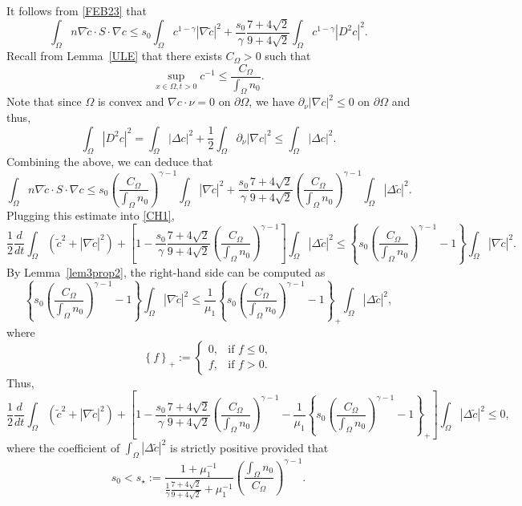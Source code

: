 \documentclass{amsart}
\numberwithin{equation}{section}
\newcommand{\bke}[1]{\left( #1 \right)}
\newcommand{\bkt}[1]{\left[ #1 \right]}
\newcommand{\bket}[1]{\left\{ #1 \right\}}
\newenvironment{pfthm3}{{\par\noindent\bf
           Proof of Theorem~\ref{THM3}. }}{\hfill\fbox{}\par\vspace{.2cm}}
\begin{document}
\begin{pfthm3}
\[\begin{aligned}
\end{aligned}
\]
It follows from \eqref{FEB23} that\[
\int_{\Omega} n\nabla \tilde{c}\cdot S \cdot \nabla c \le s_0 \int_{\Omega} c^{1-\gamma} |\nabla \tilde{c}|^2 + \frac{s_{0}}{\gamma} \frac{7+4\sqrt{2}}{9+4\sqrt{2}} \int_{\Omega} c^{1-\gamma} |D^2 c|^2.
\]
Recall from Lemma~\ref{ULE} that there exists $C_{\Omega}>0$ such that
\[
\sup_{x\in\Omega,t>0} c^{-1}\le \frac{C_{\Omega}}{\int_{\Omega}n_{0}}.
\]
Note that 
since $\Omega$ is convex and $\nabla c\cdot\nu=0$ on $\partial\Omega$, we have $\partial_\nu |\nabla c|^2 \le 0$ on $\partial\Omega$ and thus, 
\[
\int_{\Omega} |D^2 c|^2=\int_{\Omega} |\Delta c|^2+\frac{1}{2}\int_{\Omega}\partial_\nu |\nabla c|^2 \le \int_{\Omega} |\Delta c|^2.
\]  
Combining the above, we can deduce that
\[
\int_{\Omega} n\nabla \tilde{c}\cdot S \cdot \nabla c \le s_0 \bke{\frac{C_{\Omega}}{\int_{\Omega}n_{0}}}^{\gamma-1} \int_{\Omega} |\nabla \tilde{c}|^2 + \frac{s_{0}}{\gamma}\frac{7+4\sqrt{2}}{  9+4\sqrt{2} }\bke{\frac{C_{\Omega}}{\int_{\Omega}n_{0}}}^{\gamma-1} \int_{\Omega} |\Delta \tilde{c}|^2.
\]
Plugging this estimate into \eqref{CH1},  
\[
\frac{1}{2}\frac{d}{dt}\int_{\Omega}( \tilde{c}^{2}+|\nabla \tilde{c}|^{2})  + \bkt{1 - \frac{s_0}{\gamma}\frac{7+4\sqrt{2}}{  9+4\sqrt{2} }\bke{\frac{C_{\Omega}}{\int_{\Omega}n_{0}}}^{\gamma-1}}\int_{\Omega}|\Delta \tilde{c}|^{2} \le \bket{  s_0 \bke{\frac{C_{\Omega}}{\int_{\Omega}n_{0}}}^{\gamma-1}-1}\int_{\Omega }|\nabla \tilde{c}|^{2}.
\]
By Lemma~\ref{lem3prop2}, the right-hand side  can be computed as
\[
\bket{  s_0 \bke{\frac{C_{\Omega}}{\int_{\Omega}n_{0}}}^{\gamma-1}-1}\int_{\Omega }|\nabla \tilde{c}|^{2}\le \frac{1}{\mu_{1}}\bket{  s_0 \bke{\frac{C_{\Omega}}{\int_{\Omega}n_{0}}}^{\gamma-1}-1}_{+}\int_{\Omega }|\Delta \tilde{c}|^{2},
\]
where 
\[
\bket{f}_{+}:=\begin{cases}
0, & \text{if } f\le 0,\\[1mm]
f, & \text{if } f>0.
\end{cases}
\]
Thus,
\[
\frac{1}{2}\frac{d}{dt}\int_{\Omega}( \tilde{c}^{2}+|\nabla \tilde{c}|^{2})  +  \bkt{1 - \frac{s_0}{\gamma}\frac{7+4\sqrt{2}}{  9+4\sqrt{2} }\bke{\frac{C_{\Omega}}{\int_{\Omega}n_{0}}}^{\gamma-1} -\frac{1}{\mu_{1}}\bket{  s_0 \bke{\frac{C_{\Omega}}{\int_{\Omega}n_{0}}}^{\gamma-1}-1}_{+}}\int_{\Omega}|\Delta \tilde{c}|^{2} \le0,
\]
where the coefficient of $\int_{\Omega}|\Delta \tilde{c}|^{2}$ is strictly positive provided that 
\begin{equation}\label{SSTAR}
  s_0< s_{\star}:=\frac{1+ \mu_{1}^{-1}}{\frac{1}{\gamma}\frac{7+4\sqrt{2}}{9+4\sqrt{2}}+\mu_{1}^{-1}}\bke{\frac{\int_{\Omega}n_{0}}{C_{\Omega}}}^{\gamma-1}.

\end{equation}
\end{pfthm3}
\end{document}
